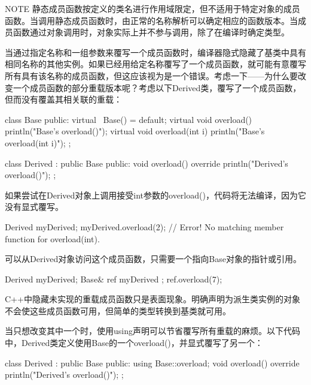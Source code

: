 \begin{myNotic}{NOTE}
静态成员函数按定义的类名进行作用域限定，但不适用于特定对象的成员函数。当调用静态成员函数时，由正常的名称解析可以确定相应的函数版本。当成员函数通过对象调用时，对象实际上并不参与调用，除了在编译时确定类型。
\end{myNotic}


当通过指定名称和一组参数来覆写一个成员函数时，编译器隐式隐藏了基类中具有相同名称的其他实例。如果已经用给定名称覆写了一个成员函数，就可能有意覆写所有具有该名称的成员函数，但这应该视为是一个错误。考虑一下——为什么要改变一个成员函数的部分重载版本呢？考虑以下Derived类，覆写了一个成员函数，但而没有覆盖其相关联的重载：

\begin{cpp}
class Base
{
    public:
        virtual ~Base() = default;
        virtual void overload() { println("Base's overload()"); }
        virtual void overload(int i) { println("Base's overload(int i)"); }
};

class Derived : public Base
{
    public:
        void overload() override { println("Derived's overload()"); }
};
\end{cpp}

如果尝试在Derived对象上调用接受int参数的overload()，代码将无法编译，因为它没有显式覆写。

\begin{cpp}
Derived myDerived;
myDerived.overload(2); // Error! No matching member function for overload(int).
\end{cpp}

可以从Derived对象访问这个成员函数，只需要一个指向Base对象的指针或引用。

\begin{cpp}
Derived myDerived;
Base& ref { myDerived };
ref.overload(7);
\end{cpp}

C++中隐藏未实现的重载成员函数只是表面现象。明确声明为派生类实例的对象不会使这些成员函数可用，但简单的类型转换到基类就可用。

当只想改变其中一个时，使用using声明可以节省覆写所有重载的麻烦。以下代码中，Derived类定义使用Base的一个overload()，并显式覆写了另一个：

\begin{cpp}
class Derived : public Base
{
    public:
        using Base::overload;
        void overload() override { println("Derived's overload()"); }
};
\end{cpp}

